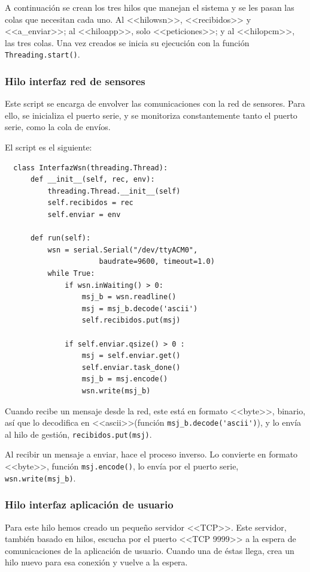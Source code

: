  A continuación se crean los tres hilos que manejan el sistema y se les pasan las colas que necesitan cada uno. Al <<hilowsn>>, <<recibidos>> y <<a\_enviar>>; al <<hiloapp>>, solo <<peticiones>>; y al <<hilopcm>>, las tres colas. Una vez creados se inicia su ejecución con la función \lstinline|Threading.start()|.
 
 \subsubsection{Hilo interfaz red de sensores}
 
 Este script se encarga de envolver las comunicaciones con la red de sensores. Para ello, se inicializa el puerto serie, y se monitoriza constantemente tanto el puerto serie, como la cola de envíos. 
 
 El script es el siguiente:
  \begin{lstlisting}
  class InterfazWsn(threading.Thread):
      def __init__(self, rec, env):
          threading.Thread.__init__(self)
          self.recibidos = rec
          self.enviar = env
      
      def run(self):
          wsn = serial.Serial("/dev/ttyACM0", 
                      baudrate=9600, timeout=1.0)
          while True:
              if wsn.inWaiting() > 0:
                  msj_b = wsn.readline()
                  msj = msj_b.decode('ascii')
                  self.recibidos.put(msj)
          
              if self.enviar.qsize() > 0 :
                  msj = self.enviar.get()
                  self.enviar.task_done()
                  msj_b = msj.encode()
                  wsn.write(msj_b)
  \end{lstlisting}
 
 
 Cuando recibe un mensaje desde la red, este está en formato <<byte>>, binario, así que lo decodifica en <<ascii>>(función \lstinline|msj_b.decode('ascii')|), y lo envía al hilo de gestión, \lstinline|recibidos.put(msj)|.
 
  Al recibir un mensaje a enviar, hace el proceso inverso. Lo convierte en formato <<byte>>, función \lstinline|msj.encode()|, lo envía por el puerto serie, \lstinline|wsn.write(msj_b)|.
  
  
 \subsubsection{Hilo interfaz aplicación de usuario}
 
 Para este hilo hemos creado un pequeño servidor <<TCP>>. Este servidor, también basado en hilos, escucha por el puerto <<TCP 9999>> a la espera de comunicaciones de la aplicación de usuario. Cuando una de éstas llega, crea un hilo nuevo para esa conexión y vuelve a la espera.
 
